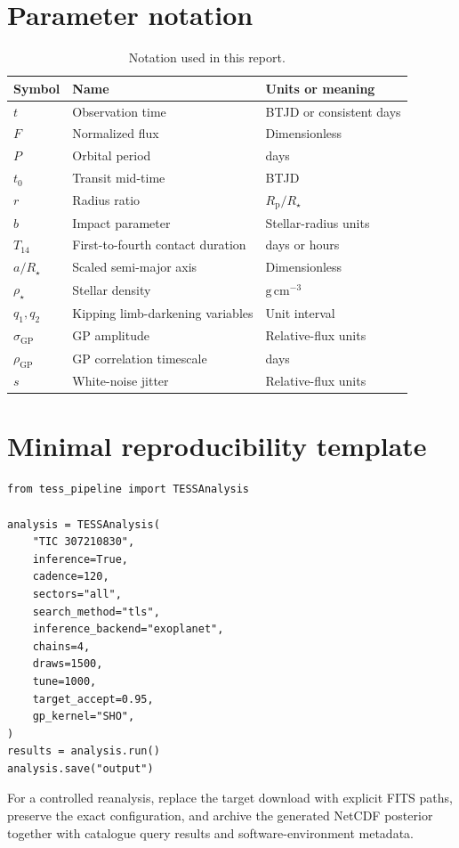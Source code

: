 \documentclass[12pt,a4paper,oneside]{report}
\newcommand{\Rstar}{\ensuremath{R_{\star}}}
\newcommand{\rhoStar}{\ensuremath{\rho_{\star}}}
\newcommand{\Rp}{\ensuremath{R_{\mathrm{p}}}}
\newcommand{\Porb}{\ensuremath{P}}
\newcommand{\Tfourteen}{\ensuremath{T_{14}}}
\newcommand{\tzero}{\ensuremath{t_{0}}}
\begin{document}
\appendix
\chapter{Parameter notation}
\begin{longtable}{p{}p{}p{}}
\caption{Notation used in this report.}\label{tab:notation}\\
\toprule
Symbol & Name & Units or meaning\\
\midrule
\(t\) & Observation time & BTJD or consistent days\\
\(F\) & Normalized flux & Dimensionless\\
\(\Porb\) & Orbital period & days\\
\(\tzero\) & Transit mid-time & BTJD\\
\(r\) & Radius ratio & \(\Rp/\Rstar\)\\
\(b\) & Impact parameter & Stellar-radius units\\
\(\Tfourteen\) & First-to-fourth contact duration & days or hours\\
\(a/\Rstar\) & Scaled semi-major axis & Dimensionless\\
\(\rhoStar\) & Stellar density & \(\mathrm{g\,cm^{-3}}\)\\
\(q_1,q_2\) & Kipping limb-darkening variables & Unit interval\\
\(\sigma_{\mathrm{GP}}\) & GP amplitude & Relative-flux units\\
\(\rho_{\mathrm{GP}}\) & GP correlation timescale & days\\
\(s\) & White-noise jitter & Relative-flux units\\
\bottomrule
\end{longtable}

\chapter{Minimal reproducibility template}
\begin{lstlisting}
from tess_pipeline import TESSAnalysis

analysis = TESSAnalysis(
    "TIC 307210830",
    inference=True,
    cadence=120,
    sectors="all",
    search_method="tls",
    inference_backend="exoplanet",
    chains=4,
    draws=1500,
    tune=1000,
    target_accept=0.95,
    gp_kernel="SHO",
)
results = analysis.run()
analysis.save("output")
\end{lstlisting}
For a controlled reanalysis, replace the target download with explicit FITS
paths, preserve the exact configuration, and archive the generated NetCDF
posterior together with catalogue query results and software-environment
metadata.
\end{document}
